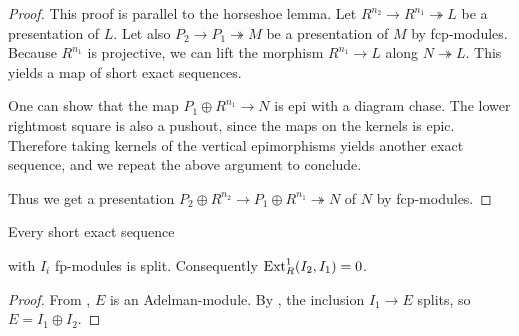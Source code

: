 \begin{proof}
  This proof is parallel to the horseshoe lemma.
  Let $R^{n_2} \rightarrow R^{n_1} \twoheadrightarrow L$ be a presentation of $L$.
  Let also $P_2 \rightarrow P_1 \twoheadrightarrow M$ be a presentation of $M$ by fcp-modules.
  Because $R^{n_1}$ is projective, we can lift the morphism $R^{n_1} \rightarrow L$ along $N \twoheadrightarrow L$.
  This yields a map of short exact sequences.
  \begin{center}
  \end{center}
  One can show that the map $P_1 \oplus R^{n_1} \rightarrow N$ is epi with a diagram chase.
  The lower rightmost square is also a pushout, since the maps on the kernels is epic.
  Therefore taking kernels of the vertical epimorphisms yields another exact sequence, and we repeat the above argument to conclude.
  \begin{center}
  \end{center}
  Thus we get a presentation $P_2 \oplus R^{n_2} \rightarrow P_1 \oplus R^{n_1} \twoheadrightarrow N$ of $N$ by fcp-modules.
\end{proof}

\begin{corollary}
  Every short exact sequence
  \begin{center}
  \end{center}
  with $I_i$ fp-modules is split.
  Consequently $\textup{Ext}^1_R(I_2,I_1) = 0$.
\end{corollary}

\begin{proof}
  From , $E$ is an Adelman-module.
  By , the inclusion $I_1 \rightarrow E$ splits, so $E = I_1 \oplus I_2$.
\end{proof}

